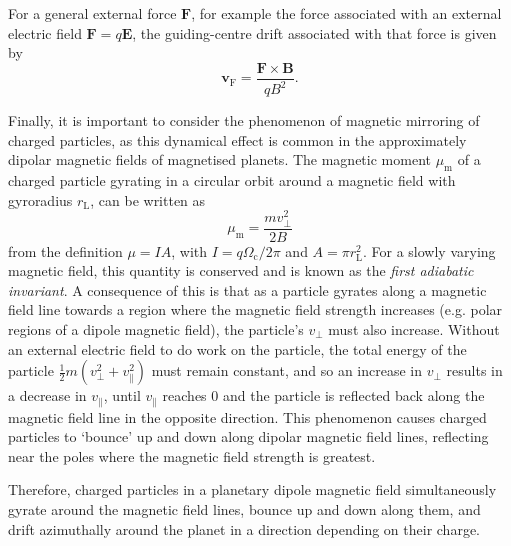 For a general external force $\boldsymbol{F}$, for example the force associated with an external electric field $\boldsymbol{F} = q\boldsymbol{E}$, the guiding-centre drift associated with that force is given by
\begin{equation}
\boldsymbol{v}_\mathrm{F} = \frac{\boldsymbol{F}\times\boldsymbol{B}}{qB^2}.
\end{equation}

Finally, it is important to consider the phenomenon of magnetic mirroring of charged particles, as this dynamical effect is common in the approximately dipolar magnetic fields of magnetised planets. The magnetic moment $\mu_\mathrm{m}$ of a charged particle gyrating in a circular orbit around a magnetic field with gyroradius $r_\mathrm{L}$, can be written as
\begin{equation}
\mu_\mathrm{m} = \frac{mv_\perp^2}{2B}
\end{equation}
from the definition $\mu = IA$, with $I = q\Omega_\mathrm{c}/2\pi$ and $A = \pi r_\mathrm{L}^2$. For a slowly varying magnetic field, this quantity is conserved and is known as the \textit{first adiabatic invariant}. A consequence of this is that as a particle gyrates along a magnetic field line towards a region where the magnetic field strength increases (e.g. polar regions of a dipole magnetic field), the particle's $v_\perp$ must also increase. Without an external electric field to do work on the particle, the total energy of the particle $\frac{1}{2}m(v_\perp^2+v_\parallel^2)$ must remain constant, and so an increase in $v_\perp$ results in a decrease in $v_\parallel$, until $v_\parallel$ reaches 0 and the particle is reflected back along the magnetic field line in the opposite direction. This phenomenon causes charged particles to `bounce' up and down along dipolar magnetic field lines, reflecting near the poles where the magnetic field strength is greatest. 

Therefore, charged particles in a planetary dipole magnetic field simultaneously gyrate around the magnetic field lines, bounce up and down along them, and drift azimuthally around the planet in a direction depending on their charge.

